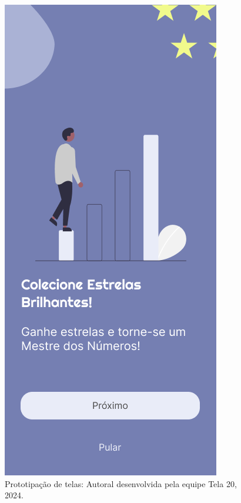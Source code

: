 \documentclass[12pt, openany, oneside, a4paper, english, brazil]{abntex2}   %
\begin{document}
\begin{figure}
    \centering
    \includegraphics[scale=0.7]{figuras/Math.Pow App/stars.png}
    \caption{Prototipação de telas: Autoral desenvolvida pela equipe Tela 20, 2024.}
    \label{fig:nome-da-imagem}
\end{figure}
\end{document}
